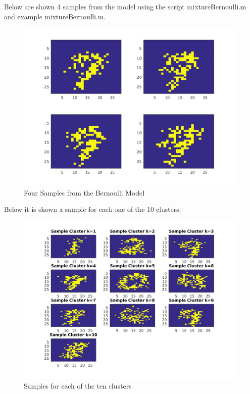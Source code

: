 \documentclass{article}
\begin{document}
Below are shown 4 samples from the model using the script mixtureBernoulli.m and example$\_$mixtureBernoulli.m.
\begin{figure}[H]
\centering
\includegraphics[scale=0.2]{samples}
\caption{Four Samples from the Bernoulli Model}
\end{figure}


Below it is shown a sample for each one of the 10 clusters.
\begin{figure}[H]
\centering
\includegraphics[scale=0.30]{cluster}
\caption{Samples for each of the ten clusters}
\end{figure} 

\newpage
{}
\end{document}
